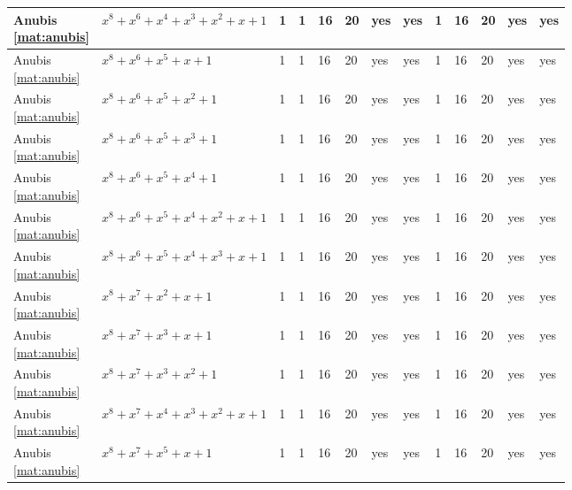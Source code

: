 \begin{tiny}
\begin{longtable}{|l|l|l|l|l|l|l|l|l|l|l|l|l|}
\shortstack{Anubis \\ \eqref{mat:anubis}} & $x^8 + x^6 + x^4 + x^3 + x^2 + x + 1$ & 1 & 1 & 16 & 20 & yes & yes & 1 & 16 & 20 & yes & yes \\ \hline
\shortstack{Anubis \\ \eqref{mat:anubis}} & $x^8 + x^6 + x^5 + x + 1$ & 1 & 1 & 16 & 20 & yes & yes & 1 & 16 & 20 & yes & yes \\ \hline
\shortstack{Anubis \\ \eqref{mat:anubis}} & $x^8 + x^6 + x^5 + x^2 + 1$ & 1 & 1 & 16 & 20 & yes & yes & 1 & 16 & 20 & yes & yes \\ \hline
\shortstack{Anubis \\ \eqref{mat:anubis}} & $x^8 + x^6 + x^5 + x^3 + 1$ & 1 & 1 & 16 & 20 & yes & yes & 1 & 16 & 20 & yes & yes \\ \hline
\shortstack{Anubis \\ \eqref{mat:anubis}} & $x^8 + x^6 + x^5 + x^4 + 1$ & 1 & 1 & 16 & 20 & yes & yes & 1 & 16 & 20 & yes & yes \\ \hline
\shortstack{Anubis \\ \eqref{mat:anubis}} & $x^8 + x^6 + x^5 + x^4 + x^2 + x + 1$ & 1 & 1 & 16 & 20 & yes & yes & 1 & 16 & 20 & yes & yes \\ \hline
\shortstack{Anubis \\ \eqref{mat:anubis}} & $x^8 + x^6 + x^5 + x^4 + x^3 + x + 1$ & 1 & 1 & 16 & 20 & yes & yes & 1 & 16 & 20 & yes & yes \\ \hline
\shortstack{Anubis \\ \eqref{mat:anubis}} & $x^8 + x^7 + x^2 + x + 1$ & 1 & 1 & 16 & 20 & yes & yes & 1 & 16 & 20 & yes & yes \\ \hline
\shortstack{Anubis \\ \eqref{mat:anubis}} & $x^8 + x^7 + x^3 + x + 1$ & 1 & 1 & 16 & 20 & yes & yes & 1 & 16 & 20 & yes & yes \\ \hline
\shortstack{Anubis \\ \eqref{mat:anubis}} & $x^8 + x^7 + x^3 + x^2 + 1$ & 1 & 1 & 16 & 20 & yes & yes & 1 & 16 & 20 & yes & yes \\ \hline
\shortstack{Anubis \\ \eqref{mat:anubis}} & $x^8 + x^7 + x^4 + x^3 + x^2 + x + 1$ & 1 & 1 & 16 & 20 & yes & yes & 1 & 16 & 20 & yes & yes \\ \hline
\shortstack{Anubis \\ \eqref{mat:anubis}} & $x^8 + x^7 + x^5 + x + 1$ & 1 & 1 & 16 & 20 & yes & yes & 1 & 16 & 20 & yes & yes \\ \hline

\end{longtable}
\end{tiny}
